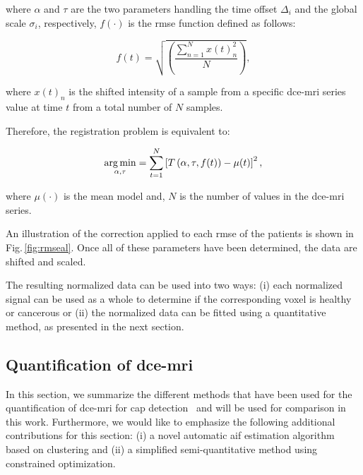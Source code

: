 \noindent where $\alpha$ and $\tau$ are the two parameters handling
the time offset $\Delta_i$ and the global scale $\sigma_i$,
respectively, $f(\cdot)$ is the \ac{rmse} function defined as follows:

\begin{equation}
  f(t) = \sqrt{ \left( \frac{\sum_{n=1}^{N} x(t)_{n}^2}{N}  \right) },
  \label{eq:rmsd}
\end{equation}

\noindent where $x(t)_n$ is the shifted intensity of a sample from a
specific \ac{dce}-\ac{mri} series value at time $t$ from a total number of $N$ samples.

Therefore, the registration problem is equivalent to:

\begin{equation}
  \operatorname*{arg\,min}_{\alpha, \tau} = \sum_{t=1}^{N} \left[ T\left(\alpha, \tau, f(t)\right) - \mu(t) \right]^{2} ,
  \label{eq:cost}
\end{equation}

\noindent where $\mu(\cdot)$ is the mean model and, $N$ is the number
of values in the \ac{dce}-\ac{mri} series.

An illustration of the correction applied to each \ac{rmse} of the patients is shown in Fig.\,\ref{fig:rmseal}.
Once all of these parameters have been determined, the data are shifted and scaled.

The resulting normalized data can be used into two ways: (i) each
normalized signal can be used as a whole to determine if the corresponding voxel is healthy or cancerous or (ii) the normalized data can be fitted using a quantitative method, as presented in the next section.

\subsection{Quantification of \ac{dce}-\ac{mri}}\label{sec:stateart}

In this section, we summarize the different methods that have been
used for the quantification of \ac{dce}-\ac{mri} for \ac{cap}
detection~\cite{lemaitre2015computer} and will be used for comparison in this work.
Furthermore, we would like to emphasize the following additional contributions for this section: (i) a novel automatic \ac{aif} estimation algorithm based on clustering and (ii) a simplified semi-quantitative method using constrained optimization.

